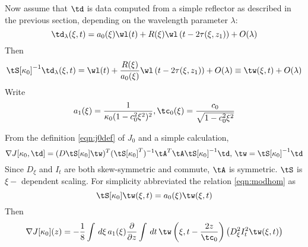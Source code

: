 Now assume that $\td$ is data computed from a simple reflector as
described in the previous section, depending on the wavelength
parameter $\lambda$:
\[
\td_{\lambda}(\xi,t) = a_0(\xi)\wl(t) +
R(\xi)\wl\left(t-2\tau(\xi,z_1)\right) + O(\lambda)
\]
Then
\begin{equation}
\label{eqn:wtildedef}
\tS[\kappa_0]^{-1}\td_{\lambda}(\xi,t) = \wl(t) +
\frac{R(\xi)}{a_0(\xi)}\wl\left(t-2\tau(\xi,z_1)\right) + O(\lambda)
\equiv \tw(\xi,t) + O(\lambda)
\end{equation}
Write 
\[
a_1(\xi)=\frac{1}{\kappa_0 (1-c_0^2\xi^2)^2}, \tc_0(\xi) =
\frac{c_0}{\sqrt{1-c_0^2\xi^2}}
\]



From the definition \ref{eqn:j0def} of $J_0$ and a simple calculation,
\[
\nabla J[\kappa_0,\td] = (D\tS[\kappa_0]\tw)^T(\tS[\kappa_0]^T)^{-1}\tA^T\tA
\tS[\kappa_0]^{-1}\td,  \,\tw=\tS[\kappa_0]^{-1}\td
\]
Since $D_{\xi}$ and $I_t$ are both skew-symmetric and commute, $\tA$
is symmetric. $\tS$ is $\xi-$ dependent scaling. For simplicity
abbreviated the relation \ref{eqn:modhom} as
\[
\tS[\kappa_0]\tw(\xi,t) = a_0(\xi)\tw(\xi,t)
\]
Then
\[
\nabla J[\kappa_0](z) =
- 
\frac{1}{8} \int \,d\xi\,a_1(\xi)\frac{\partial}{\partial z} \int \,dt\, 
  \tw\left(\xi,t-\frac{2z}{\tc_0}\right)\left(D_{\xi}^2I_t^2 \tw(\xi,t)\right)
\]

